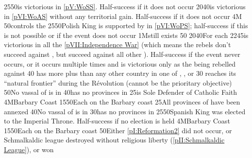 %
%
{25}{50}{\FRA is victorious in \ref{pV:WoSS}. Half-success if it does not
  occur}%
%
%
{20}{40}{\FRA is victorious in \ref{pVI:WoAS} without any territorial
  gain. Half-success if it does not occur}%
%
\EUobjective4M{}{}%
{}{50}{\paysmajeurFrance controls the }%
%
%
{25}{50}{Polish King is supported by \FRA in \ref{pVI:WoPS}; half-success if
  this is not possible or if the event does not occur}%
%
%
\EUobjective1M{\payspologne still exists}{}%
{}{50}{}%
%
%
{20}{40}{For each }%
%
%
{22}{45}{\FRA is victorious in all the \ref{pVII:Independence War} (which
  means the rebels don't succeed against \FRA, but succeed against all other
  \MAJ). Half-success if the event never occurs, or it occurs multiple times
  and \FRA is victorious only as the \MAJ being rebelled against }%
%
%
{}{40}{ has more \TP plus \COL than any other country in
  one of , , or
  }%
%
%
%
{}{30}{ reaches its ``natural frontier'' during the
  Révolution (cannot be the prioritary objective)}%
%
 
%
%
{}{50}{No vassal of \paysmajeurFrance is in \regionItalie}%
%
%
{}{40}{\paysmajeurFrance has no provinces in \regionItalie}%
%
%
{}{25}{\HIS is Sole Defender of Catholic Faith}%
%
\EUobjective4M{Barbary Coast}{\Presidio}%
{15}{50}{Each \Presidio on the Barbary coast}%
%
%
{}{25}{All provinces of \paysprovincesne have been annexed}%
%
%
%
{}{40}{No vassal of \paysmajeurFrance is in \regionItalie}%
%
%
{}{30}{\paysmajeurFrance has no provinces in \regionItalie}%
%
%
{25}{50}{Spanish King was elected to the Imperial Throne. Half-success if no
  election is held}%
%
\EUobjective4M{Barbary Coast}{\Presidio}%
{15}{50}{Each \Presidio on the Barbary coast}%
%
%
{}{50}{Either \ref{pI:Reformation2} did not occur, or Schmalkaldic league
  destroyed without religious liberty (\ref{pII:Schmalkaldic League}),
  or  won}%
